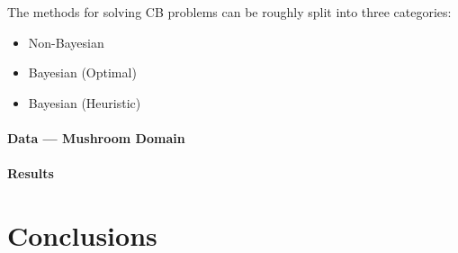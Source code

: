 \documentclass[11pt]{article}
\begin{document}





The methods for solving CB problems can be roughly split into three
categories:
%
\begin{itemize}
  \item Non-Bayesian
  \item Bayesian (Optimal)
  \item Bayesian (Heuristic)
\end{itemize}

\paragraph{Data --- Mushroom Domain}

\paragraph{Results}

\section{Conclusions}
\end{document}
